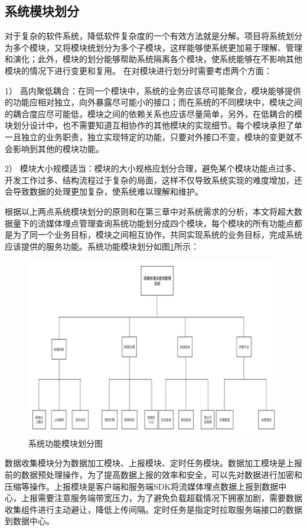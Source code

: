 \subsection{系统模块划分}

对于复杂的软件系统，降低软件复杂度的一个有效方法就是分解。项目将系统划分为多个模块，又将模块统划分为多个子模块，这样能够使系统更加易于理解、管理和演化；此外，模块的划分能够帮助系统隔离各个模块，使系统能够在不影响其他模块的情况下进行变更和复用。
在对模块进行划分时需要考虑两个方面：

1）	高内聚低耦合：在同一个模块中，系统的业务应该尽可能聚合，模块能够提供的功能应相对独立，向外暴露尽可能小的接口；而在系统的不同模块中，模块之间的耦合度应尽可能低，模块之间的依赖关系也应该尽量简单，另外，在低耦合的模块划分设计中，也不需要知道互相协作的其他模块的实现细节。每个模块承担了单一且独立的业务职责，独立实现特定的功能，只要对外接口不变，模块的变更就不会影响到其他的模块功能。

2）	模块大小规模适当：模块的大小规格应划分合理，避免某个模块功能点过多、开发工作过多、结构流程过于复杂的局面，这样不仅导致系统实现的难度增加，还会导致数据的处理更加复杂，使系统难以理解和维护。

根据以上两点系统模块划分的原则和在第三章中对系统需求的分析，本文将超大数据量下的流媒体埋点管理查询系统功能划分成四个模块，每个模块的所有功能点都是为了同一个业务目标，模块之间相互协作，共同实现系统的业务目标，完成系统应该提供的服务功能。系统功能模块划分如图\ref{huafen}所示：
\begin{figure}[htb]
  \centering
  \includegraphics[width=5in]{figure/chapter4/系统功能模块划分图.jpg}
  \caption{系统功能模块划分图}\label{huafen}
\end{figure}

数据收集模块分为数据加工模块、上报模块、定时任务模块。数据加工模块是上报前的数据预处理操作，为了提高数据上报的效率和安全，可以先对数据进行加密和压缩等操作。上报模块是客户端和服务端SDK将流媒体埋点数据上报到数据中心，上报需要注意服务端带宽压力，为了避免负载超载情况下拥塞加剧，需要数据收集组件进行主动避让，降低上传间隔。定时任务是指定时拉取服务端接口的数据到数据中心。

